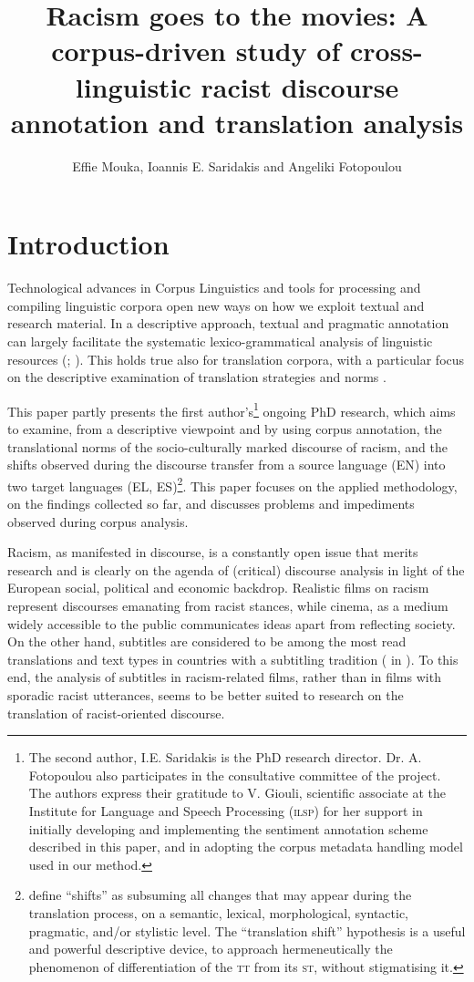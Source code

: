 \documentclass[output=paper]{LSP/langsci}
\author{Effie Mouka, Ioannis E. Saridakis and Angeliki Fotopoulou}
\title{Racism goes to the movies: A corpus-driven study of cross-linguistic racist discourse annotation and translation analysis}
\begin{document}
\section{Introduction} \label{sec:2:1}
Technological advances in Corpus Linguistics and tools for processing and compiling linguistic corpora open new ways on how we exploit textual and research material. In a descriptive approach, textual and pragmatic annotation can largely facilitate the systematic lexico-grammatical analysis of linguistic resources (\citealt[29--31]{EneryHardie2012}; \citealt[76--79]{Zanettin2012}). This holds true also for translation corpora, with a particular focus on the descriptive examination of translation strategies and norms \citep[78--96]{Zanettin2012}.

This paper partly presents the first author's\footnote{The second author, I.E. Saridakis is the PhD research director. Dr. A. Fotopoulou also participates in the consultative committee of the project. The authors express their gratitude to V. Giouli, scientific associate at the Institute for Language and Speech Processing (\textsc{ilsp}) for her support in initially developing and implementing the sentiment annotation scheme described in this paper, and in adopting the corpus metadata handling model used in our method.} ongoing PhD research, which aims to examine, from a descriptive viewpoint and by using corpus annotation, the translational norms of the socio-culturally marked discourse of racism, and the shifts observed during the discourse transfer from a source language (EN) into two target languages (EL, ES)\footnote{\citet[120--121]{Batsalia2010} define “shifts” as subsuming all changes that may appear during the translation process, on a semantic, lexical, morphological, syntactic, pragmatic, and/or stylistic level. The “translation shift” hypothesis is a useful and powerful descriptive device, to approach hermeneutically the phenomenon of differentiation of the \textsc{tt} from its \textsc{st}, without stigmatising it.}. This paper focuses on the applied methodology, on the findings collected so far, and discusses problems and impediments observed during corpus analysis.

Racism, as manifested in discourse, is a constantly open issue that merits research \citep{Dijk1993,Reisigl2001} and is clearly on the agenda of (critical) discourse analysis in light of the European social, political and economic backdrop. Realistic films on racism represent discourses emanating from racist stances, while cinema, as a medium widely accessible to the public communicates ideas apart from reflecting society. On the other hand, subtitles are considered to be among the most read translations and text types in countries with a subtitling tradition (\citealt[153]{Gottlieb1997} in \citealt[125]{Pedersen2011}). To this end, the analysis of subtitles in racism-related films, rather than in films with sporadic racist utterances, seems to be better suited to research on the translation of racist-oriented discourse.
\end{document}
